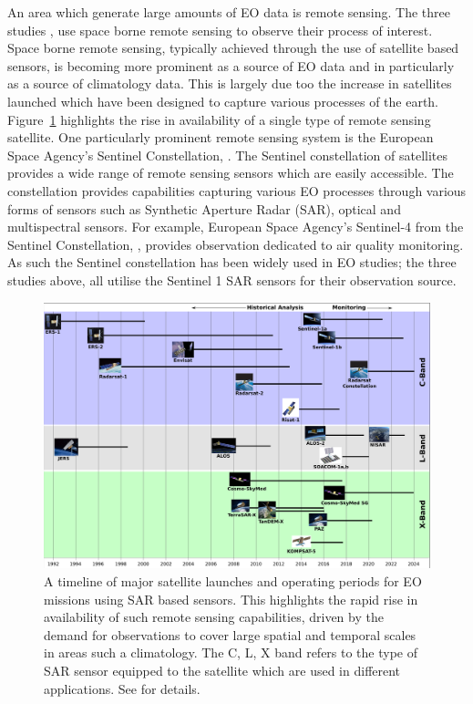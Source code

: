 An area which generate large amounts of EO data is remote sensing.
The three studies ,\citep{muro_short-term_2016, raspini_continuous_2018, khabbazan_crop_2019} use space borne remote sensing to observe their process of interest. 
Space borne remote sensing, typically achieved through the use of satellite based sensors, is becoming more prominent as a source of EO data and in particularly as a source of climatology data.
This is largely due too the increase in satellites launched which have been designed to capture various processes of the earth.
Figure~\ref{fig:sar_timeline} highlights the rise in availability of a single type of remote sensing satellite.
One particularly prominent remote sensing system is the European Space Agency's Sentinel Constellation, \cite{aschbacher_european_2012}.
The Sentinel constellation of satellites provides a wide range of remote sensing sensors which are easily accessible.
The constellation provides capabilities capturing various EO processes through various forms of sensors such as Synthetic Aperture Radar (SAR), optical and multispectral sensors.
For example, European Space Agency's Sentinel-4 from the Sentinel Constellation, \cite{aschbacher_european_2012}, provides observation dedicated to air quality monitoring.
As such the Sentinel constellation has been widely used in EO studies; the three studies above, \citep{muro_short-term_2016, khabbazan_crop_2019, raspini_continuous_2018}  all utilise the Sentinel 1 SAR sensors for their observation source. 

\begin{figure}[htbp!] 
	\centering    
	\includegraphics[width=1.0\textwidth]{Sensors}
	\caption[Timeline of major EO satellites]{A timeline of major satellite launches and operating periods for EO missions using SAR based sensors. This highlights the rapid rise in availability of such remote sensing capabilities, driven by the demand for observations to cover large spatial and temporal scales in areas such a climatology. The C, L, X band refers to the type of SAR sensor equipped to the satellite which are used in different applications. See \citep{oliver_understanding_2004} for details.}
	\label{fig:sar_timeline}
\end{figure}

